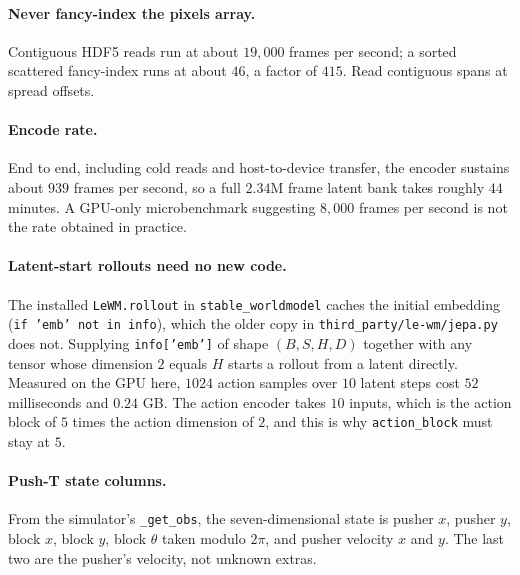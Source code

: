 \documentclass[11pt,a4paper]{article}
\begin{document}
\paragraph{Never fancy-index the pixels array.} Contiguous HDF5 reads run at about $19{,}000$
frames per second; a sorted scattered fancy-index runs at about $46$, a factor of $415$. Read
contiguous spans at spread offsets.

\paragraph{Encode rate.} End to end, including cold reads and host-to-device transfer, the
encoder sustains about $939$ frames per second, so a full $2.34$M frame latent bank takes
roughly $44$ minutes. A GPU-only microbenchmark suggesting $8{,}000$ frames per second is not
the rate obtained in practice.

\paragraph{Latent-start rollouts need no new code.} The installed
\texttt{LeWM.rollout} in \texttt{stable\_worldmodel} caches the initial embedding
(\texttt{if 'emb' not in info}), which the older copy in \texttt{third\_party/le-wm/jepa.py}
does not. Supplying \texttt{info['emb']} of shape $(B, S, H, D)$ together with any tensor whose
dimension $2$ equals $H$ starts a rollout from a latent directly. Measured on the GPU here,
$1024$ action samples over $10$ latent steps cost $52$ milliseconds and $0.24$ GB. The action
encoder takes $10$ inputs, which is the action block of $5$ times the action dimension of $2$,
and this is why \texttt{action\_block} must stay at $5$.

\paragraph{Push-T state columns.} From the simulator's \texttt{\_get\_obs}, the seven-dimensional
state is pusher $x$, pusher $y$, block $x$, block $y$, block $\theta$ taken modulo $2\pi$, and
pusher velocity $x$ and $y$. The last two are the pusher's velocity, not unknown extras.

\printbibliography
\end{document}

